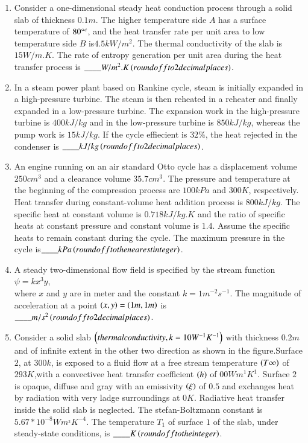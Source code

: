 \documentclass[journal]{IEEEtran}
\begin{document}
\begin{enumerate}
\begin{figure}[h!]
\end{figure}

     \item Consider a one-dimensional steady heat conduction process through a solid slab of 
     thickness $0.1 m$. The higher temperature side $A$ has a surface temperature of $80\degree^{c}$, and the heat transfer rate per unit area to low temperature side $B$ is$ 4.5 kW/m^{2}$. The thermal conductivity of the slab is $15 W/m.K$. The rate of entropy generation per unit area during the heat transfer process is $\_\_\_\_ W/m^{2}.K \left(round off to 2 decimal places\right)$.\\
     \item In a steam power plant based on Rankine cycle, steam is initially expanded in a 
     high-pressure turbine. The steam is then reheated in a reheater and finally expanded in a low-pressure turbine. The expansion work in the high-pressure turbine is $400 kJ/kg$ and in the low-pressure turbine is $850 kJ/kg$, whereas the pump work is $15 kJ/kg$. If the cycle effiecient is $32\%$, the heat rejected in the condenser is $\_\_\_\_kJ/kg \left(round off to 2 decimal places\right)$.\\
     \item An engine running on an air standard Otto cycle has a displacement volume $250 cm^{3}$
     and a clearance volume $35.7 cm^{3}$. The pressure and temperature at the beginning of the compression process are $100 kPa$ and $300 K$, respectively. Heat transfer during constant-volume heat addition process is $800 kJ/kg$. The specific heat at constant volume is $0.718 kJ/kg.K$ and the ratio of specific heats at constant pressure and constant volume is $1.4$. Assume the specific heats to remain constant during the cycle. The maximum pressure in the cycle is$\_\_\_\_ kPa \left(round off to the nearest integer\right)$.\\
     \item A steady two-dimensional flow field is specified by the stream function\\
                      $\psi=kx^{3}y$,\\
     where $x$ and $y$ are in meter and the constant $k=1 m^{-2}s^{-1}$. The magnitude of acceleration at a point $\left(x,y\right)=\left(1 m,1 m\right)$ is $\_\_\_\_m/s^{2} \left(round off to 2 decimal places\right)$.\\
     \item Consider a solid slab $\left(thermal conductivity, k=10 W^{-1}K^{-1}\right)$ with thickness $0.2 m$ and of infinite extent in the other two direction as shown in the figure.Surface $2$, at $300 k$, is exposed to a fluid flow at a free stream temperature $\left(T\infty\right)$ of $293 K$,with a convectivee heat transfer coefficient $\left(h\right)$ of $00 Wm^{1}K^{1}$. Surface $2$ is opaque, diffuse and gray with an emissivity $\left(\xi\right)$ of $0.5$ and exchanges heat by radiation with very ladge surroundings at $0 K$. Radiative heat transfer inside the solid slab is neglected. The stefan-Boltzmann constant is $5.67*10^{-8}Wm^{_2}K^{-4}$. The temperature $T_{1}$ of surface $1$ of the slab, under steady-state conditions, is $\_\_\_\_K \left(round off to the integer\right)$.\\

\end{enumerate}
\end{document}

